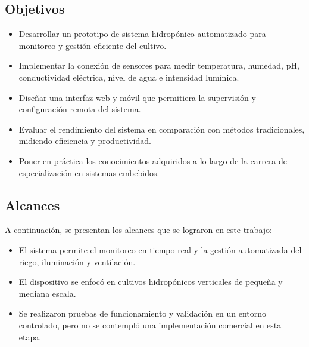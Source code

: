\subsection{Objetivos}
\begin{itemize}
    \item Desarrollar un prototipo de sistema hidropónico automatizado para monitoreo y gestión eficiente del cultivo.
    \item Implementar la conexión de sensores para medir temperatura, humedad, pH, conductividad eléctrica, nivel de agua e intensidad lumínica.
    \item Diseñar una interfaz web y móvil que permitiera la supervisión y configuración remota del sistema.
    \item Evaluar el rendimiento del sistema en comparación con métodos tradicionales, midiendo eficiencia y productividad.
    \item Poner en práctica los conocimientos adquiridos a lo largo de la carrera de especialización en sistemas embebidos.
\end{itemize}

\subsection{Alcances}

A continuación, se presentan los alcances que se lograron en este trabajo:

\begin{itemize}
    \item El sistema permite el monitoreo en tiempo real y la gestión automatizada del riego, iluminación y ventilación.
    \item El dispositivo se enfocó en cultivos hidropónicos verticales de pequeña y mediana escala.
    \item Se realizaron pruebas de funcionamiento y validación en un entorno controlado, pero no se contempló una implementación comercial en esta etapa.
\end{itemize}







